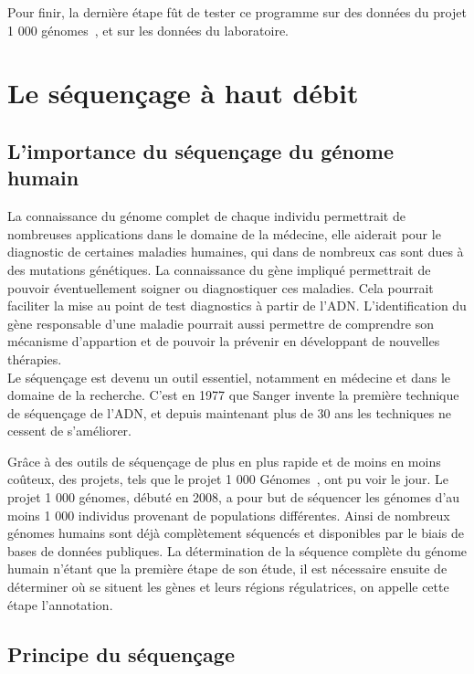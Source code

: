 \documentclass[a4paper,12pt]{article}
\begin{document}
Pour finir, la dernière étape fût de tester ce programme sur des données du projet 1 000 génomes~\cite{1000Genomes}, et sur les données du laboratoire.


\section{Le séquençage à haut débit}

\subsection{L'importance du séquençage du génome humain}

La connaissance du génome complet de chaque individu permettrait de nombreuses applications dans le domaine de la médecine, elle aiderait pour le diagnostic de certaines maladies humaines, qui dans de nombreux cas sont dues à des mutations génétiques. La connaissance du gène impliqué permettrait de pouvoir éventuellement soigner ou diagnostiquer ces maladies. Cela pourrait faciliter la mise au point de test diagnostics à partir de l'ADN. L'identification du gène responsable d'une maladie pourrait aussi permettre de comprendre son mécanisme d'appartion et de pouvoir la prévenir en développant de nouvelles thérapies. \\

Le séquençage est devenu un outil essentiel, notamment en médecine et dans le domaine de la recherche. C'est en 1977 que Sanger invente la première technique de séquençage de l'ADN, et depuis maintenant plus de 30 ans les techniques ne cessent de s'améliorer. 

Grâce à des outils de séquençage de plus en plus rapide et de moins en moins coûteux, des projets, tels que le projet 1 000 Génomes~\cite{1000Genomes}, ont pu voir le jour. Le projet 1 000 génomes, débuté en 2008, a pour but de séquencer les génomes d'au moins 1 000 individus provenant de populations différentes. Ainsi de nombreux génomes humains sont déjà complètement séquencés et disponibles par le biais de bases de données publiques. La détermination de la séquence complète du génome humain n'étant que la première étape de son étude, il est nécessaire ensuite de déterminer où se situent les gènes et leurs régions régulatrices, on appelle cette étape l'annotation. 

\subsection{Principe du séquençage }
\end{document}
